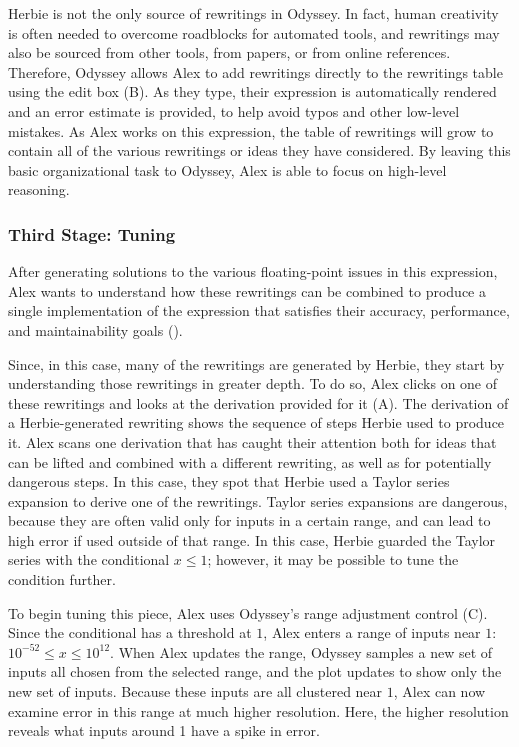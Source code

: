 Herbie is not the only source of rewritings in Odyssey.
In fact, human creativity is often needed
  to overcome roadblocks for automated tools,
  and rewritings may also be sourced from other tools,
  from papers, or from online references.
Therefore, Odyssey allows Alex to add rewritings
  directly to the rewritings table using the edit box (B).
As they type,
  their expression is automatically rendered
  and an error estimate is provided,
  to help avoid typos and other low-level mistakes.
As Alex works on this expression,
  the table of rewritings will grow to contain
  all of the various rewritings or ideas they have considered.
By leaving this basic organizational task to Odyssey,
  Alex is able to focus on high-level reasoning.

\subsubsection*{Third Stage: Tuning}

After generating solutions
  to the various floating-point issues in this expression,
  Alex wants to understand how these rewritings can be combined
  to produce a single implementation of the expression
  that satisfies their accuracy, performance, and maintainability goals
  ().

Since, in this case, many of the rewritings are generated by Herbie,
  they start by understanding those rewritings
  in greater depth.
To do so, Alex clicks on one of these rewritings
  and looks at the derivation provided for it (A).
The derivation of a Herbie-generated rewriting
  shows the sequence of steps Herbie used to produce it.
Alex scans one derivation that has caught their attention
  both for ideas
  that can be lifted and combined with a different rewriting,
  as well as for potentially dangerous steps.
In this case, they spot
  that Herbie used a Taylor series expansion
  to derive one of the rewritings.
Taylor series expansions are dangerous,
  because they are often valid only for inputs in a certain range,
  and can lead to high error if used outside of that range.
In this case, Herbie guarded the Taylor series
  with the conditional $x \le 1$;
  however, it may be possible to tune the condition further.

To begin tuning this piece, Alex uses
  Odyssey's range adjustment control (C).
Since the conditional has a threshold at $1$, 
  Alex enters a range of inputs near $1$: 
  $10^{-52} \le x \le 10^{12}$.
When Alex updates the range,
  Odyssey samples a new set of inputs
  all chosen from the selected range,
  and the plot updates to show only the new set of inputs.
Because these inputs are all clustered near $1$,
  Alex can now examine error in this range
  at much higher resolution.
Here, the higher resolution reveals
  what inputs around 1 have a spike in error.

